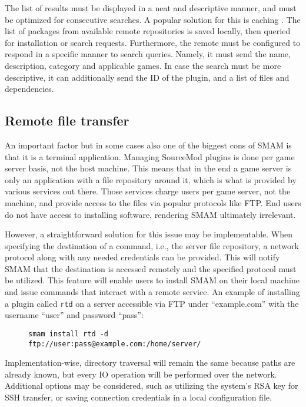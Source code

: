 The list of results must be displayed in a neat and descriptive manner, and must be optimized for consecutive searches.
A popular solution for this is caching \cite{apt-caching}.
The list of packages from available remote repositories is saved locally, then queried for installation or search requests.
Furthermore, the remote must be configured to respond in a specific manner to search queries.
Namely, it must send the name, description, category and applicable games.
In case the search must be more descriptive, it can additionally send the ID of the plugin, and a list of files and dependencies.

\subsection{Remote file transfer}

An important factor but in some cases also one of the biggest cons of SMAM is that it is a terminal application.
Managing SourceMod plugins is done per game server basis, not the host machine.
This means that in the end a game server is only an application with a file repository around it, which is what is provided by various services out there.
Those services charge users per game server, not the machine, and provide access to the files via popular protocols like FTP\@.
End users do not have access to installing software, rendering SMAM ultimately irrelevant.

However, a straightforward solution for this issue may be implementable.
When specifying the destination of a command, i.e., the server file repository, a network protocol along with any needed credentials can be provided.
This will notify SMAM that the destination is accessed remotely and the specified protocol must be utilized.
This feature will enable users to install SMAM on their local machine and issue commands that interact with a remote service.
An example of installing a plugin called \verb|rtd| on a server accessible via FTP under ``example.com'' with the username ``user'' and password ``pass'':

\begin{figure}[htp]
\centering
\verb|smam install rtd -d ftp://user:pass@example.com:/home/server/|
\end{figure}

Implementation-wise, directory traversal will remain the same because paths are already known, but every IO operation will be performed over the network.
Additional options may be considered, such as utilizing the system's RSA key for SSH transfer, or saving connection credentials in a local configuration file.

